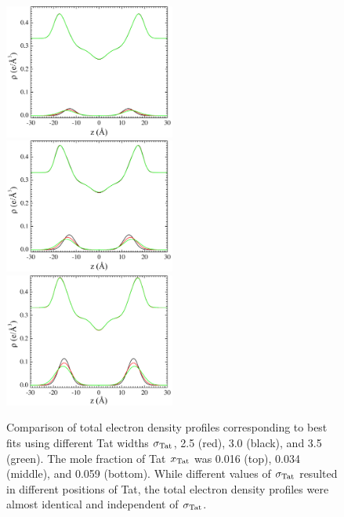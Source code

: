 \begin{figure}[htbp]
  \centering
  \includegraphics[width=0.5\textwidth]{figures/Tat/SDP_Results/EDP/DOPC_Tat_62to1_EDP}
  \includegraphics[width=0.5\textwidth]{figures/Tat/SDP_Results/EDP/DOPC_Tat_28to1_EDP}
  \includegraphics[width=0.5\textwidth]{figures/Tat/SDP_Results/EDP/DOPC_Tat_16to1_EDP}
  \caption[Comparison of total electron density profiles corresponding to best fits using 
  different Tat widths $\sigmaTat$, 2.5 (red), 3.0 (black), and 3.5 (green)]
  {Comparison of total electron density profiles corresponding to best fits using 
  different Tat widths $\sigmaTat$, 2.5 (red), 3.0 (black), and 3.5 (green). 
  The mole fraction of Tat $x_\textrm{Tat}$
  was 0.016 (top), 0.034 (middle), and 0.059 (bottom). While different values of 
  $\sigmaTat$ resulted in different positions of Tat, the total electron density
  profiles were almost identical and independent of $\sigmaTat$.}
  \label{fig:DOPC_Tat_EDP}
\end{figure}

